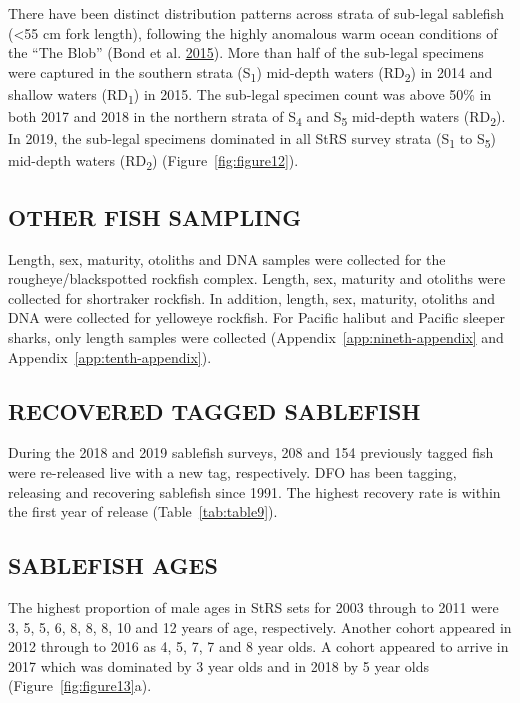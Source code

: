 \documentclass[12pt]{article}\usepackage[]{graphicx}\usepackage[]{color}
\begin{document}
There have been distinct distribution patterns across strata of sub-legal sablefish (\textless55 cm fork length), following the highly anomalous warm ocean conditions of the ``The Blob'' (Bond et al. \protect\hyperlink{ref-Bond2015}{2015}). More than half of the sub-legal specimens were captured in the southern strata (S\textsubscript{1}) mid-depth waters (RD\textsubscript{2}) in 2014 and shallow waters (RD\textsubscript{1}) in 2015. The sub-legal specimen count was above 50\% in both 2017 and 2018 in the northern strata of S\textsubscript{4} and S\textsubscript{5} mid-depth waters (RD\textsubscript{2}). In 2019, the sub-legal specimens dominated in all StRS survey strata (S\textsubscript{1} to S\textsubscript{5}) mid-depth waters (RD\textsubscript{2}) (Figure~\ref{fig:figure12}).

\hypertarget{other-fish-sampling}{%
\subsection{OTHER FISH SAMPLING}\label{other-fish-sampling}}

Length, sex, maturity, otoliths and DNA samples were collected for the rougheye/blackspotted rockfish complex. Length, sex, maturity and otoliths were collected for shortraker rockfish. In addition, length, sex, maturity, otoliths and DNA were collected for yelloweye rockfish. For Pacific halibut and Pacific sleeper sharks, only length samples were collected (Appendix~\ref{app:nineth-appendix} and Appendix~\ref{app:tenth-appendix}).

\hypertarget{recovered-tagged-sablefish}{%
\subsection{RECOVERED TAGGED SABLEFISH}\label{recovered-tagged-sablefish}}

During the 2018 and 2019 sablefish surveys, 208 and 154 previously tagged fish were re-released live with a new tag, respectively. DFO has been tagging, releasing and recovering sablefish since 1991. The highest recovery rate is within the first year of release (Table~\ref{tab:table9}).

\hypertarget{sablefish-ages}{%
\subsection{SABLEFISH AGES}\label{sablefish-ages}}

The highest proportion of male ages in StRS sets for 2003 through to 2011 were 3, 5, 5, 6, 8, 8, 8, 10 and 12 years of age, respectively. Another cohort appeared in 2012 through to 2016 as 4, 5, 7, 7 and 8 year olds. A cohort appeared to arrive in 2017 which was dominated by 3 year olds and in 2018 by 5 year olds (Figure~\ref{fig:figure13}a).
\end{document}
